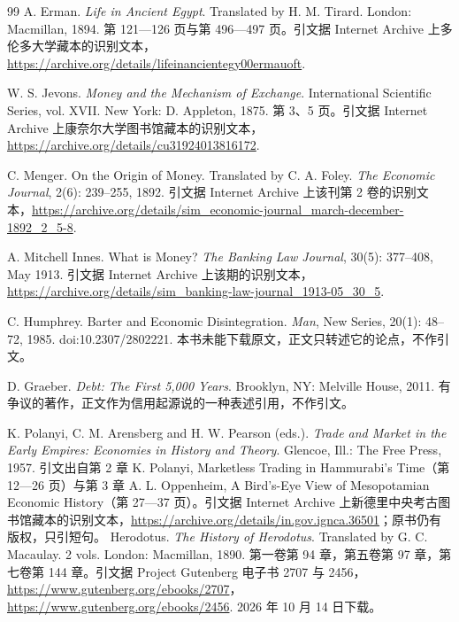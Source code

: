 \begin{thebibliography}{99}
 A. Erman. \emph{Life in Ancient Egypt}. Translated by H. M. Tirard. London: Macmillan, 1894. 第 121—126 页与第 496—497 页。引文据 Internet Archive 上多伦多大学藏本的识别文本，\url{https://archive.org/details/lifeinancientegy00ermauoft}.

 W. S. Jevons. \emph{Money and the Mechanism of Exchange}. International Scientific Series, vol. XVII. New York: D. Appleton, 1875. 第 3、5 页。引文据 Internet Archive 上康奈尔大学图书馆藏本的识别文本，\url{https://archive.org/details/cu31924013816172}.

 C. Menger. On the Origin of Money. Translated by C. A. Foley. \emph{The Economic Journal}, 2(6): 239--255, 1892. 引文据 Internet Archive 上该刊第 2 卷的识别文本，\url{https://archive.org/details/sim_economic-journal_march-december-1892_2_5-8}.

 A. Mitchell Innes. What is Money? \emph{The Banking Law Journal}, 30(5): 377--408, May 1913. 引文据 Internet Archive 上该期的识别文本，\url{https://archive.org/details/sim_banking-law-journal_1913-05_30_5}.

 C. Humphrey. Barter and Economic Disintegration. \emph{Man}, New Series, 20(1): 48--72, 1985. doi:10.2307/2802221. 本书未能下载原文，正文只转述它的论点，不作引文。

 D. Graeber. \emph{Debt: The First 5,000 Years}. Brooklyn, NY: Melville House, 2011. 有争议的著作，正文作为信用起源说的一种表述引用，不作引文。

 K. Polanyi, C. M. Arensberg and H. W. Pearson (eds.). \emph{Trade and Market in the Early Empires: Economies in History and Theory}. Glencoe, Ill.: The Free Press, 1957. 引文出自第 2 章 K. Polanyi, Marketless Trading in Hammurabi's Time（第 12—26 页）与第 3 章 A. L. Oppenheim, A Bird's-Eye View of Mesopotamian Economic History（第 27—37 页）。引文据 Internet Archive 上新德里中央考古图书馆藏本的识别文本，\url{https://archive.org/details/in.gov.ignca.36501}；原书仍有版权，只引短句。
 Herodotus. \emph{The History of Herodotus}. Translated by G. C. Macaulay. 2 vols. London: Macmillan, 1890. 第一卷第 94 章，第五卷第 97 章，第七卷第 144 章。引文据 Project Gutenberg 电子书 2707 与 2456，\url{https://www.gutenberg.org/ebooks/2707}，\url{https://www.gutenberg.org/ebooks/2456}. 2026 年 10 月 14 日下载。


\end{thebibliography}
